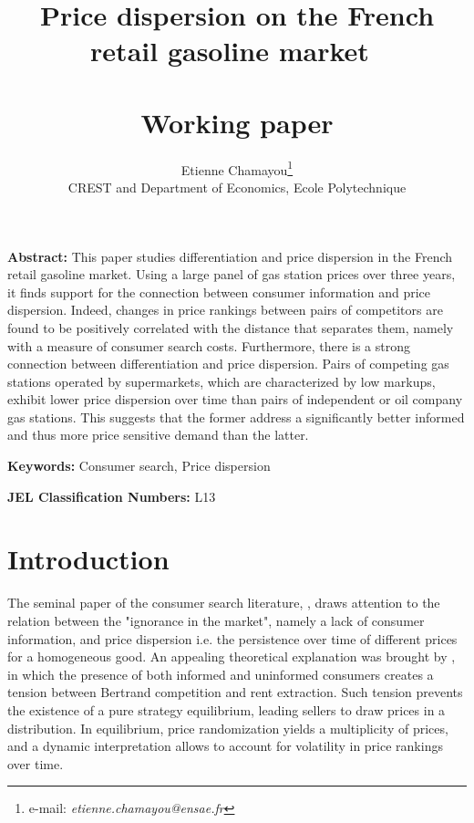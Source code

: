 \documentclass[english]{article}
\begin{document}
\title{Price dispersion on the French retail gasoline market\ \\ \ \\Working paper}
\author{Etienne Chamayou\thanks{e-mail:
\textit{etienne.chamayou@ensae.fr}}\medskip\\{\normalsize CREST and Department of Economics, Ecole Polytechnique }}
\maketitle

\sloppy%

\onehalfspacing

\textbf{Abstract:}
This paper studies differentiation and price dispersion in the French retail gasoline market. Using a large panel of gas station prices over three years, it finds support for the connection between consumer information and price dispersion. Indeed, changes in price rankings between pairs of competitors are found to be positively correlated with the distance that separates them, namely with a measure of consumer search costs. Furthermore, there is a strong connection between differentiation and price dispersion. Pairs of competing gas stations operated by supermarkets, which are characterized by low markups, exhibit lower price dispersion over time than pairs of independent or oil company gas stations. This suggests that the former address a significantly better informed and thus more price sensitive demand than the latter.

\strut

\textbf{Keywords:} Consumer search, Price dispersion

\strut

\textbf{JEL Classification Numbers:} L13

\pagebreak%

\section{Introduction}

The seminal paper of the consumer search literature, \cite{STI61}, draws attention to the relation between the "ignorance in the market", namely a lack of consumer information, and price dispersion i.e. the persistence over time of different prices for a homogeneous good. An appealing theoretical explanation was brought by \cite{VAR80}, in which the presence of both informed and uninformed consumers creates a tension between Bertrand competition and rent extraction. Such tension prevents the existence of a pure strategy equilibrium, leading sellers to draw prices in a distribution. In equilibrium, price randomization yields a multiplicity of prices, and a dynamic interpretation allows to account for volatility in price rankings over time.
\end{document}
